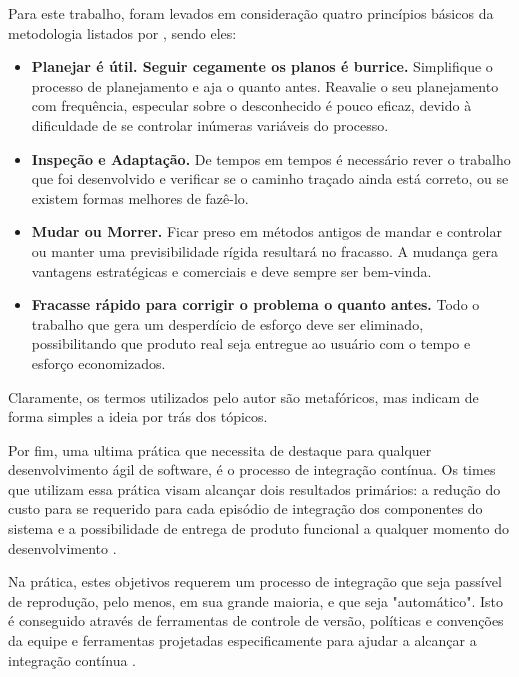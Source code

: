Para este trabalho, foram levados em consideração quatro princípios básicos da metodologia listados por , sendo eles: 
	\begin{itemize}
		\item \textbf{Planejar é útil. Seguir cegamente os planos é burrice.} Simplifique o processo de planejamento e aja o quanto antes. Reavalie o seu planejamento com frequência, especular sobre o desconhecido é pouco eficaz, devido à dificuldade de se controlar inúmeras variáveis do processo.
		\item \textbf{Inspeção e Adaptação.} De tempos em tempos é necessário rever o trabalho que foi desenvolvido e verificar se o caminho traçado ainda está correto, ou se existem formas melhores de fazê-lo.
		\item \textbf{Mudar ou Morrer.} Ficar preso em métodos antigos de mandar e controlar ou manter uma previsibilidade rígida resultará no fracasso. A mudança gera vantagens estratégicas e comerciais e deve sempre ser bem-vinda.
		\item \textbf{Fracasse rápido para corrigir o problema o quanto antes.} Todo o trabalho que gera um desperdício de esforço deve ser eliminado, possibilitando que produto real seja entregue ao usuário com o tempo e esforço economizados.
	\end{itemize}
	
Claramente, os termos utilizados pelo autor são metafóricos, mas indicam de forma simples a ideia por trás dos tópicos.

Por fim, uma ultima prática que necessita de destaque para qualquer desenvolvimento ágil de software,  é o processo de integração contínua. Os times que utilizam essa prática visam alcançar dois resultados primários: a redução do custo para se requerido para cada episódio de integração dos componentes do sistema e a possibilidade de entrega de produto funcional a qualquer momento do desenvolvimento \cite{agile2015}.

Na prática, estes objetivos requerem um processo de integração que seja passível de reprodução, pelo menos, em sua grande maioria, e que seja "automático". Isto é conseguido através de ferramentas de controle de versão, políticas e convenções da equipe e ferramentas projetadas especificamente para ajudar a alcançar a integração contínua \cite{agile2015}.

